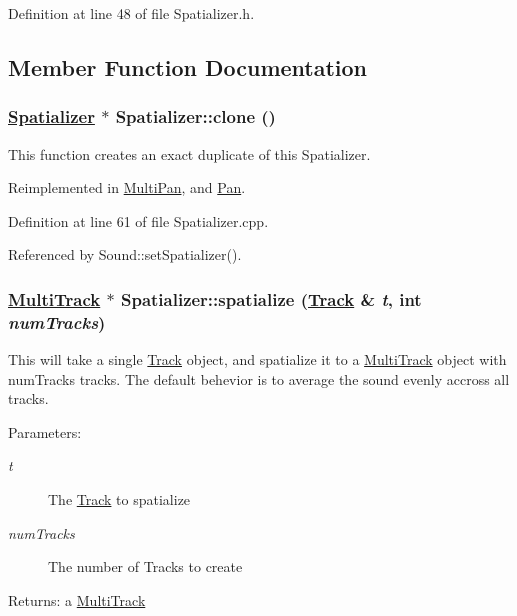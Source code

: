 Definition at line 48 of file Spatializer.h.

\subsection{Member Function Documentation}
\hypertarget{classSpatializer_a1}{
\subsubsection[clone]{\setlength{\rightskip}{0pt plus 5cm}\hyperlink{classSpatializer}{Spatializer} $\ast$ Spatializer::clone ()}}
\label{classSpatializer_a1}


This function creates an exact duplicate of this Spatializer. 

Reimplemented in \hyperlink{classMultiPan_a3}{Multi\-Pan}, and \hyperlink{classPan_a1}{Pan}.

Definition at line 61 of file Spatializer.cpp.

Referenced by Sound::set\-Spatializer().\hypertarget{classSpatializer_a0}{
\subsubsection[spatialize]{\setlength{\rightskip}{0pt plus 5cm}\hyperlink{classMultiTrack}{Multi\-Track} $\ast$ Spatializer::spatialize (\hyperlink{classTrack}{Track} \& {\em t}, int {\em num\-Tracks})}}
\label{classSpatializer_a0}


This will take a single \hyperlink{classTrack}{Track} object, and spatialize it to a \hyperlink{classMultiTrack}{Multi\-Track} object with num\-Tracks tracks. The default behevior is to average the sound evenly accross all tracks. \begin{Desc}
\item[Parameters:]
\begin{description}
\item[{\em t}]The \hyperlink{classTrack}{Track} to spatialize \item[{\em num\-Tracks}]The number of Tracks to create \end{description}
\end{Desc}
\begin{Desc}
\item[Returns:]a \hyperlink{classMultiTrack}{Multi\-Track} \end{Desc}


